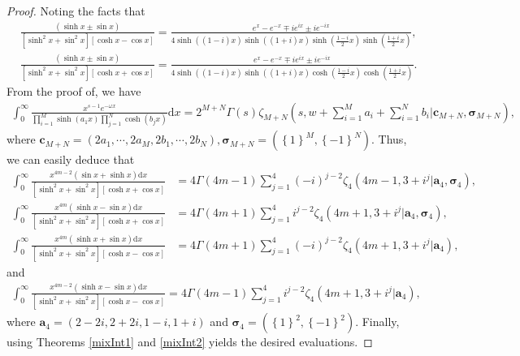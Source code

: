 \documentclass[11pt]{article}
\theoremstyle{plain}
\theoremstyle{definition}
\begin{document}
\begin{proof}
Noting the facts that 	
\begin{align*}
&\frac{\left( \sinh x\pm \sin x \right)}{\left[ \sinh ^2x+\sin ^2x \right] \left[ \cosh x-\cos x \right]}=\frac{e^x-e^{-x}\mp ie^{ix}\pm ie^{-ix}}{4\sinh \left( \left( 1-i \right) x \right) \sinh \left( \left( 1+i \right) x \right) \sinh \left( \frac{1-i}{2}x \right) \sinh \left( \frac{1+i}{2}x \right)},
\\
&\frac{\left( \sinh x\pm \sin x \right)}{\left[ \sinh ^2x+\sin ^2x \right] \left[ \cosh x+\cos x \right]}=\frac{e^x-e^{-x}\mp ie^{ix}\pm ie^{-ix}}{4\sinh \left( \left( 1-i \right) x \right) \sinh \left( \left( 1+i \right) x \right) \cosh \left( \frac{1-i}{2}x \right) \cosh \left( \frac{1+i}{2}x \right)}.
\end{align*}
From  the proof of\cite[Prop. 2]{BV2024}, we have
 \begin{align*}
\int_0^{\infty}{\frac{x^{s-1}e^{-\omega x}}{\prod_{i=1}^M{\sinh \left( a_1x \right)}\prod_{j=1}^N{\cosh \left( b_jx \right)}}}\mathrm{d}x=2^{M+N}\Gamma \left( s \right) \zeta _{M+N}\left( s,w+\sum_{i=1}^M{a_i+}\sum_{i=1}^N{b_i}|\boldsymbol{c}_{M+N},\boldsymbol{\sigma }_{M+N} \right),
\end{align*}
where $
\boldsymbol{c}_{M+N}=\left( 2a_1,\cdots ,2a_M,2b_1,\cdots ,2b_N \right) , \boldsymbol{\sigma }_{M+N}=\left( \left\{ 1 \right\}^M,\left\{ -1 \right\}^N \right) .
$ Thus,
we can easily deduce that
 \begin{align*}
    	\int_0^{\infty}{\frac{x^{4m-2}\left( \sin x+\sinh x \right) \mathrm{d}x}{\left[ \sinh ^2x+\sin ^2x \right] \left[ \cosh x+\cos x \right]}}
    	&=4\Gamma \left( 4m-1 \right) \sum_{j=1}^4{\left( -i \right) ^{j-2}}\zeta _4\left( 4m-1,3+i^j|\mathbf{a}_4,\boldsymbol{\sigma }_4 \right) ,\\
    \int_0^{\infty}{\frac{x^{4m}\left( \sinh x-\sin x \right) \mathrm{d}x}{\left[ \sinh ^2x+\sin ^2x \right] \left[ \cosh x+\cos x \right]}}
  &=4\Gamma \left( 4m+1 \right) \sum_{j=1}^4{ i  ^{j-2}}\zeta _4\left( 4m+1,3+i^j|\mathbf{a}_4,\boldsymbol{\sigma }_4 \right) ,
    	\\
      	\int_0^{\infty}{\frac{x^{4m}\left( \sinh x+\sin x \right) \mathrm{d}x}{\left[ \sinh ^2x+\sin ^2x \right] \left[ \cosh x-\cos x \right]}}
  &	=4\Gamma \left( 4m+1 \right) \sum_{j=1}^4{\left( -i \right) ^{j-2}}\zeta _4(4m+1,3+i^j|\mathbf{a}_4),
    			\end{align*}
and
    	 \begin{align*}
    		\int_0^{\infty}{\frac{x^{4m-2}\left( \sinh x-\sin x \right) \mathrm{d}x}{\left[ \sinh ^2x+\sin ^2x \right] \left[ \cosh x-\cos x \right]}}	=4\Gamma \left( 4m-1 \right) \sum_{j=1}^4{i  ^{j-2}}\zeta _4(4m+1,3+i^j|\mathbf{a}_4),
    	\end{align*}
where $\mathbf{a}_4=\left( 2-2i,2+2i,1-i,1+i \right) $ and $\boldsymbol{\sigma }_4=\left( \left\{ 1 \right\}^2,\left\{ -1 \right\}^2 \right)$.
Finally, using Theorems \ref{mixInt1} and \ref{mixInt2} yields the desired evaluations.
\end{proof}
\end{document}
